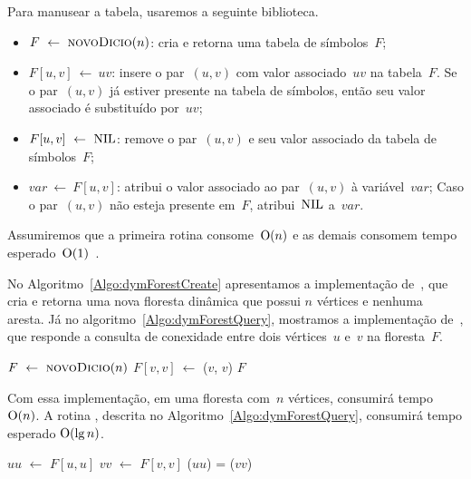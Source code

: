 Para manusear a tabela, usaremos a seguinte biblioteca.
\begin{itemize}
    \item $F~\gets~\text{\scshape novoDicio}(n)$: cria e retorna uma tabela de símbolos~$F$;
    \item $F[u,v]~\gets~uv$: insere o par~$(u,v)$ com valor associado~$uv$ na tabela~$F$.
    Se o par~$(u,v)$ já estiver presente na tabela de símbolos, então seu valor associado é substituído por~$uv$;
    \item $F[u,v]~\gets~\text{NIL}{}$: remove o par~$(u,v)$ e seu valor associado da tabela de símbolos~$F$;
    \item $var~\gets~F[u,v]$: atribui o valor associado ao par~$(u,v)$ à variável~$var$; Caso o par~$(u,v)$ não esteja presente em~$F$, atribui~$\text{NIL}$ a~$var$.
\end{itemize}
Assumiremos que a primeira rotina consome~$\mathrm{O}(n)$ e as demais consomem tempo esperado~$\mathrm{O}(1)$~\cite{CLRS}.

No Algoritmo~\ref{Algo:dymForestCreate} apresentamos a implementação de~\dymForestCreate{}, que cria e retorna uma nova floresta dinâmica que possui $n$ vértices e nenhuma aresta.
Já no algoritmo~\ref{Algo:dymForestQuery}, mostramos a implementação de~\dymForestQuery{}, que responde a consulta de conexidade entre dois vértices~$u$ e~$v$ na floresta~$F$.


\begin{algorithm}[htb]
\caption{\dymForestCreate($n$)}
\label{Algo:dymForestCreate}
\begin{algorithmic}[1]
\State $F~\gets~\text{\scshape novoDicio}(n)$
\label{Algo:dymForestCreate:for}
\State $F[v,v]~\gets$ \treapCreate($v$, $v$)
\EndFor
\State \Return $F$
\end{algorithmic}
\end{algorithm}

Com essa implementação, em uma floresta com~$n$ vértices, \dymForestCreate{} consumirá tempo~$\mathrm{O}(n)$. A rotina \dymForestQuery{}, descrita no Algoritmo~\ref{Algo:dymForestQuery}, consumirá tempo esperado $\mathrm{O}(\lg n)$.


\begin{algorithm}[htb]
\caption{\dymForestQuery($F$, $u$, $v$)}
\label{Algo:dymForestQuery}
\begin{algorithmic}[1]
\State $uu$ $\gets$ $F[u,u]$
\State $vv$ $\gets$ $F[v,v]$
\State \Return \treapGetRoot($uu$) = \treapGetRoot($vv$)
\end{algorithmic}
\end{algorithm}

